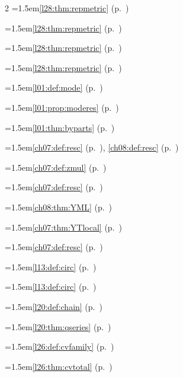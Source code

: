 \begin{multicols}{2}
\hangindent=1.5em\quad \ref{l28:thm:repmetric} (p.~\pageref{l28:thm:repmetric})\par
\hangindent=1.5em\quad \ref{l28:thm:repmetric} (p.~\pageref{l28:thm:repmetric})\par
\hangindent=1.5em\quad \ref{l28:thm:repmetric} (p.~\pageref{l28:thm:repmetric})\par
\hangindent=1.5em\quad \ref{l28:thm:repmetric} (p.~\pageref{l28:thm:repmetric})\par
\hangindent=1.5em\quad \ref{l01:def:mode} (p.~\pageref{l01:def:mode})\par
\hangindent=1.5em\quad \ref{l01:prop:moderes} (p.~\pageref{l01:prop:moderes})\par
\hangindent=1.5em\quad \ref{l01:thm:byparts} (p.~\pageref{l01:thm:byparts})\par
\hangindent=1.5em\quad \ref{ch07:def:resc} (p.~\pageref{ch07:def:resc}), \ref{ch08:def:resc} (p.~\pageref{ch08:def:resc})\par
\hangindent=1.5em\quad \ref{ch07:def:zmul} (p.~\pageref{ch07:def:zmul})\par
\hangindent=1.5em\quad \ref{ch07:def:resc} (p.~\pageref{ch07:def:resc})\par
\hangindent=1.5em\quad \ref{ch08:thm:YML} (p.~\pageref{ch08:thm:YML})\par
\hangindent=1.5em\quad \ref{ch07:thm:YTlocal} (p.~\pageref{ch07:thm:YTlocal})\par
\hangindent=1.5em\quad \ref{ch07:def:resc} (p.~\pageref{ch07:def:resc})\par
\hangindent=1.5em\quad \ref{l13:def:circ} (p.~\pageref{l13:def:circ})\par
\hangindent=1.5em\quad \ref{l13:def:circ} (p.~\pageref{l13:def:circ})\par
\hangindent=1.5em\quad \ref{l20:def:chain} (p.~\pageref{l20:def:chain})\par
\hangindent=1.5em\quad \ref{l20:thm:qseries} (p.~\pageref{l20:thm:qseries})\par
\hangindent=1.5em\quad \ref{l26:def:cvfamily} (p.~\pageref{l26:def:cvfamily})\par
\hangindent=1.5em\quad \ref{l26:thm:cvtotal} (p.~\pageref{l26:thm:cvtotal})\par

\end{multicols}
